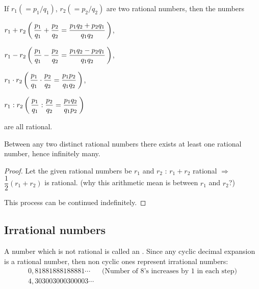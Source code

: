 \documentclass[11pt]{amsbook}
\begin{document}
\begin{hProperty} 
If 
$r_{1} (=p_{1}/q_{1})$, 
$r_{2} (=p_{2}/q_{2})$ 
are two rational numbers, then the numbers 
\noindent
\begin{hbColi}{2}
	
	\item 
	$r_{1}+r_{2}  
	 \left( \, \dfrac{p_{1}}{q_{1}} 
		+ \dfrac{p_{2}}{q_{2}}
	= \dfrac{p_{1} q_{2} + p_{2} q_{1}}
		{q_{1} q_{2}} \, \right) $,

	\item 
	$r_{1}-r_{2} 
	 \left( \, \dfrac{p_{1}}{q_{1}} 
		- \dfrac{p_{2}}{q_{2}}
	= \dfrac{p_{1} q_{2} - p_{2} q_{1}}
		{q_{1} q_{2}} \, \right) $,

	\item 
	$r_{1} \cdot r_{2}
	 \left( \, \dfrac{p_{1}}{q_{1}} 
		\cdot \dfrac{p_{2}}{q_{2}}
	= \dfrac{p_{1} p_{2}}
	{q_{1} q_{2}} \, \right) $,

	\item 
	$r_{1}:r_{2}
	 \left( \, \dfrac{p_{1}}{q_{1}} 
		: \dfrac{p_{2}}{q_{2}}
	= \dfrac{p_{1} q_{2}}
		{q_{1} p_{2}} \, \right) $
\end{hbColi} 
are all rational.
\end{hProperty}

\begin{cor}
	Between any two distinct rational numbers 
	there exists at least one rational number, 
	hence infinitely many.

	\begin{proof}
		Let the given rational numbers be $r_{1}$ and $r_{2}$ :
		$r_{1} + r_{2}$ rational 
		$\Longrightarrow$ 
		$\dfrac{1}{2}(r_{1} + r_{2})$ is rational.
		(why this arithmetic mean is between $r_{1}$ and $r_{2}$?) 
		
		This process can be continued indefinitely.
	\end{proof}
\end{cor}





\subsection{Irrational numbers}
\label{subsec:IrrationalNumbers}

A number which is not rational is called an 
. 
Since any cyclic decimal expansion is a rational number, 
then non cyclic ones represent irrational numbers:
\begin{align*}
	0,81881888188881\cdots 
	&\text{ (Number of 8's increases by 1 in each step)} \\
	4,303003000300003\cdots 
	&
\end{align*}
\end{document}
